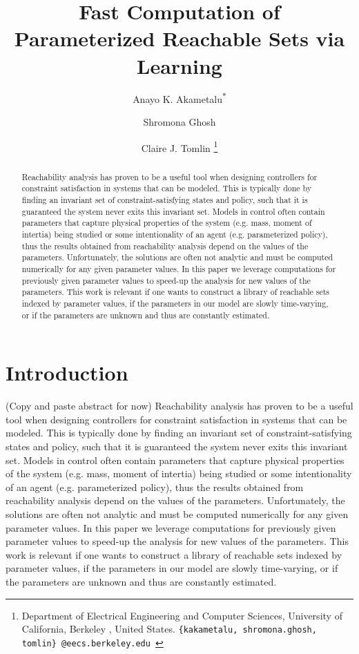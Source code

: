 \documentclass{journal}
\title{\LARGE \bf
Fast Computation of Parameterized Reachable Sets via Learning 
}
\author{
Anayo K. Akametalu\textsuperscript{$*$} \and Shromona Ghosh \and Claire J. Tomlin
\thanks{
 Department of Electrical Engineering and Computer Sciences, 
        University of California, Berkeley , United States.\newline
        {\tt\small \{kakametalu, shromona.ghosh, tomlin\}~@eecs.berkeley.edu }}%
}
\begin{document}
\maketitle
\thispagestyle{empty}
\pagestyle{empty}

\begin{abstract}
Reachability analysis has proven to be a useful tool when designing controllers for constraint satisfaction in systems that can be modeled. This is typically done by finding an invariant set of constraint-satisfying states and policy, such that it is guaranteed the system never exits this invariant set. Models in control often contain parameters that capture physical properties of the system (e.g. mass, moment of intertia) being studied or some intentionality of an agent (e.g. parameterized policy), thus the results obtained from reachability analysis depend on the values of the parameters. Unfortunately, the solutions are often not analytic and must be computed numerically for any given parameter values. In this paper we leverage computations for previously given parameter values to speed-up the analysis for new values of the parameters. This work is relevant if one wants to construct a library of reachable sets indexed by parameter values, if the parameters in our model are slowly time-varying, or if the parameters are unknown and thus are constantly estimated.
\end{abstract}


\section{Introduction}
(Copy and paste abstract for now) Reachability analysis has proven to be a useful tool when designing controllers for constraint satisfaction in systems that can be modeled. This is typically done by finding an invariant set of constraint-satisfying states and policy, such that it is guaranteed the system never exits this invariant set. Models in control often contain parameters that capture physical properties of the system (e.g. mass, moment of intertia) being studied or some intentionality of an agent (e.g. parameterized policy), thus the results obtained from reachability analysis depend on the values of the parameters. Unfortunately, the solutions are often not analytic and must be computed numerically for any given parameter values. In this paper we leverage computations for previously given parameter values to speed-up the analysis for new values of the parameters. This work is relevant if one wants to construct a library of reachable sets indexed by parameter values, if the parameters in our model are slowly time-varying, or if the parameters are unknown and thus are constantly estimated.
\end{document}

